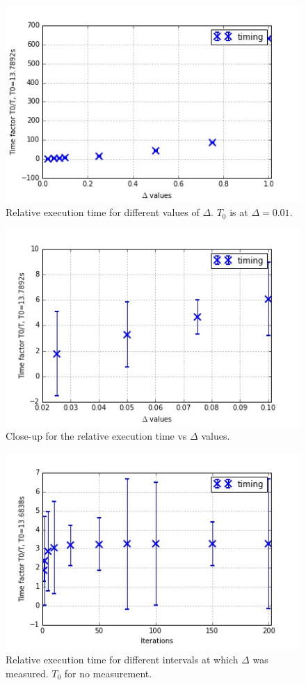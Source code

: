 \documentclass[11pt]{article}
\begin{document}
	\begin{figure}[H]	
		\centering
		\includegraphics[scale=0.5]{itervs3.jpeg}
		\caption{Relative execution time for different values of $\Delta$. $T_0$ is at $\Delta=0.01$.}\label{iter3}
	\end{figure}

	
	\begin{figure}[H]	
		\centering
		\includegraphics[scale=0.5]{itervs32.jpeg}
		\caption{Close-up for the relative execution time vs $\Delta$ values.}\label{iter32}
	\end{figure}

	
	\begin{figure}[H]	
		\centering
		\includegraphics[scale=0.5]{itervs4.jpeg}
		\caption{Relative execution time for different intervals at which $\Delta$ was measured. $T_0$ for no measurement.}\label{iter4}
	\end{figure}
\end{document}
